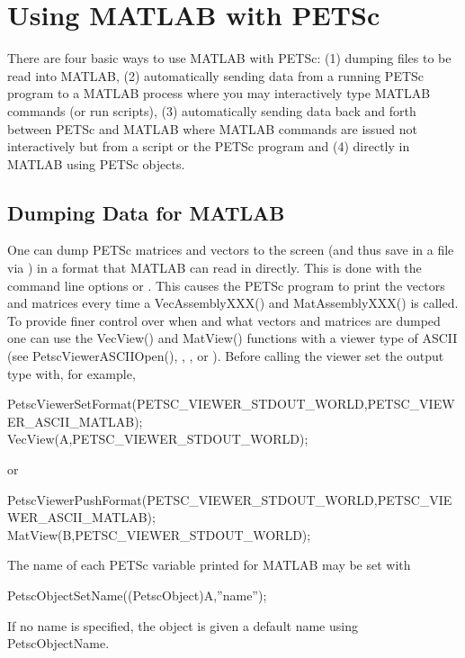 \cleardoublepage
\chapter{Using MATLAB with PETSc}
\label{ch_matlab}

There are four basic ways to use MATLAB with PETSc: (1) dumping files to
be read into MATLAB, (2) automatically sending data from a running PETSc program
to a MATLAB process where you may interactively type MATLAB commands (or run
scripts), (3) automatically sending data back and forth between PETSc and
MATLAB where MATLAB commands are issued not interactively but from a script or
the PETSc program and (4) directly in MATLAB using PETSc objects.

\section{Dumping Data for MATLAB}
One can dump PETSc matrices and vectors to the screen (and thus save in a file via
) in a format that MATLAB can read in directly. This is done with the
command line options  or . This causes the PETSc program
to print the vectors and matrices every time a VecAssemblyXXX() and MatAssemblyXXX()
is called.   To provide finer control
over when and what vectors and matrices are dumped one can use the VecView() and
MatView() functions with a viewer type of ASCII (see PetscViewerASCIIOpen(),
, , or ). Before calling
the viewer set the output type with, for example,
\begin{tabbing}
  PetscViewerSetFormat(PETSC\_VIEWER\_STDOUT\_WORLD,PETSC\_VIEWER\_ASCII\_MATLAB);\\
  VecView(A,PETSC\_VIEWER\_STDOUT\_WORLD);
\end{tabbing}
or
\begin{tabbing}
  PetscViewerPushFormat(PETSC\_VIEWER\_STDOUT\_WORLD,PETSC\_VIEWER\_ASCII\_MATLAB);\\
  MatView(B,PETSC\_VIEWER\_STDOUT\_WORLD);
\end{tabbing}
The name of each PETSc variable printed for MATLAB may be set with
\begin{tabbing}
PetscObjectSetName((PetscObject)A,''name'');
\end{tabbing}
If no name is specified, the object is given a default name using PetscObjectName.

